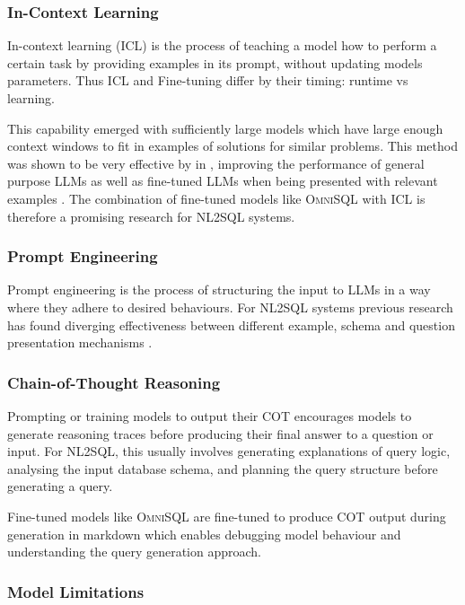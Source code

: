 \subsubsection{In-Context Learning}

In-context learning (ICL) is the process of teaching a model how to perform a
certain task by providing examples in its prompt, without updating models
parameters. Thus ICL and Fine-tuning differ by their timing: runtime vs
learning.

This capability emerged with sufficiently large models which have large enough
context windows to fit in examples of solutions for similar problems. This
method was shown to be very effective by \citeauthor{DAIL-SQL} in \citeyear{DAIL-SQL},
improving the performance of general purpose LLMs as well as fine-tuned LLMs
when being presented with relevant examples \citep{DAIL-SQL}. The combination of
fine-tuned models like \textsc{OmniSQL} with ICL is therefore a promising
research for NL2SQL systems.

\subsubsection{Prompt Engineering}

Prompt engineering is the process of structuring the input to LLMs in a way
where they adhere to desired behaviours. For NL2SQL systems previous research
has found diverging effectiveness between different example, schema and
question presentation mechanisms \citep{DAIL-SQL, OmniSQL}.

\subsubsection{Chain-of-Thought Reasoning}

Prompting or training models to output their COT encourages models to generate
reasoning traces before producing their final answer to a question or input.
For NL2SQL, this usually involves generating explanations of query logic,
analysing the input database schema, and planning the query structure before
generating a query.

Fine-tuned models like \textsc{OmniSQL} are fine-tuned to produce COT output
during generation in markdown which enables debugging model behaviour and
understanding the query generation approach. 

\subsubsection{Model Limitations}

